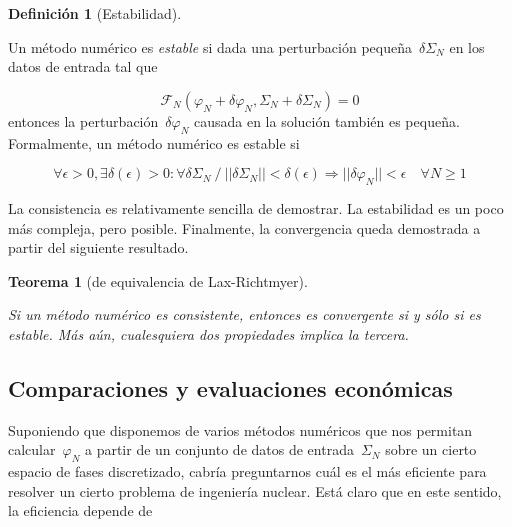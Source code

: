 \documentclass[
  12pt,
  a4paper,
  table]{scrbook}
\theoremstyle{plain}
\theoremstyle{definition}
\newtheorem{definition}{Definición}[chapter]
\theoremstyle{plain}
\newtheorem{theorem}{Teorema}[chapter]
\theoremstyle{plain}
\theoremstyle{remark}
\begin{document}
\begin{definition}[Estabilidad]\protect\hypertarget{def-estabilidad}{}\label{def-estabilidad}

Un método numérico es \emph{estable} si dada una perturbación
pequeña~\(\delta \Sigma_N\) en los datos de entrada tal que

\[
\mathcal{F}_N(\varphi_N + \delta \varphi_N, \Sigma_N + \delta \Sigma_N) = 0
\] entonces la perturbación~\(\delta \varphi_N\) causada en la solución
también es pequeña. Formalmente, un método numérico es estable si

\[
\forall \epsilon > 0, \exists \delta(\epsilon) > 0 : \forall \delta \Sigma_N~/~ || \delta \Sigma_N || < \delta(\epsilon) \Rightarrow || \delta \varphi_N || < \epsilon \quad \forall N \geq 1
\]

\end{definition}

La consistencia es relativamente sencilla de demostrar. La estabilidad
es un poco más compleja, pero posible. Finalmente, la convergencia queda
demostrada a partir del siguiente resultado.

\begin{theorem}[de equivalencia de
Lax-Richtmyer]\protect\hypertarget{thm-lax}{}\label{thm-lax}

Si un método numérico es consistente, entonces es convergente si y sólo
si es estable. Más aún, cualesquiera dos propiedades implica la tercera.

\end{theorem}

\hypertarget{comparaciones-y-evaluaciones-econuxf3micas}{%
\subsection{Comparaciones y evaluaciones
económicas}\label{comparaciones-y-evaluaciones-econuxf3micas}}

Suponiendo que disponemos de varios métodos numéricos que nos permitan
calcular~\(\varphi_N\) a partir de un conjunto de datos de
entrada~\(\Sigma_N\) sobre un cierto espacio de fases discretizado,
cabría preguntarnos cuál es el más eficiente para resolver un cierto
problema de ingeniería nuclear. Está claro que en este sentido, la
eficiencia depende de
\end{document}
